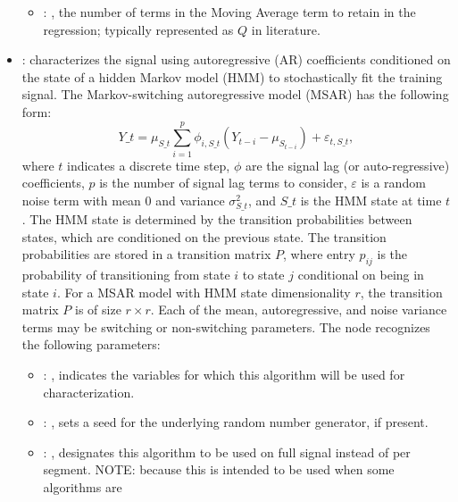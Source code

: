 \begin{itemize}
\begin{itemize}
        \item {}: , 
          the number of terms in the Moving Average term to retain in the
          regression; typically represented as $Q$ in literature.
      \end{itemize}

    \item {}:
      characterizes the signal using autoregressive (AR) coefficients conditioned         on the
      state of a hidden Markov model (HMM) to stochastically fit the training signal.         The
      Markov-switching autoregressive model (MSAR) has the following form:         \begin{equation*}
      Y\_t = \mu_{S\_t} \sum_{i=1}^p \phi_{i,{S\_t}} \left(Y_{t-i} - \mu_{S_{t-i}}\right) +
      \varepsilon_{t,{S\_t}},         \end{equation*}         where $t$ indicates a discrete time
      step, $\phi$ are the signal lag (or auto-regressive)         coefficients, $p$ is the number
      of signal lag terms to consider, $\varepsilon$ is a random noise         term with mean 0 and
      variance $\sigma^2_{S\_t}$, and $S\_t$ is the HMM state at time $t$.         The HMM state is
      determined by the transition probabilities between states, which are conditioned         on
      the previous state. The transition probabilities are stored in a transition matrix $P$,
      where entry $p_{ij}$ is the probability of transitioning from state $i$ to state $j$
      conditional         on being in state $i$. For a MSAR model with HMM state dimensionality $r$,
      the transition matrix         $P$ is of size $r \times r$. Each of the mean, autoregressive,
      and noise variance terms may be         switching or non-switching parameters.
      The  node recognizes the following parameters:
        \begin{itemize}
          \item {}: , 
            indicates the variables for which this algorithm will be used for characterization.
          \item {}: , 
            sets a seed for the underlying random number generator, if present.
          \item {}: , 
            designates this algorithm to be used on full signal instead of per
            segment. NOTE: because this is intended to be used when some algorithms are

\end{itemize}
\end{itemize}
